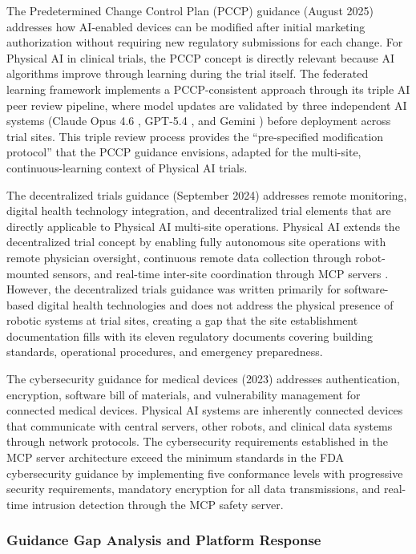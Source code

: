 The Predetermined Change Control Plan (PCCP) guidance (August 2025)
addresses how AI-enabled devices can be modified after initial marketing
authorization without requiring new regulatory submissions for each change.
For Physical AI in clinical trials, the PCCP concept is directly relevant
because AI algorithms improve through learning during the trial itself. The
federated learning framework \cite{fl-paper} implements a PCCP-consistent
approach through its triple AI peer review pipeline, where model updates are
validated by three independent AI systems (Claude Opus 4.6 \cite{claude-opus},
GPT-5.4 \cite{gpt-5-4}, and Gemini \cite{gemini}) before deployment across
trial sites. This triple review process provides the ``pre-specified
modification protocol'' that the PCCP guidance envisions, adapted for the
multi-site, continuous-learning context of Physical AI trials.

The decentralized trials guidance (September 2024) addresses remote
monitoring, digital health technology integration, and decentralized trial
elements that are directly applicable to Physical AI multi-site operations.
Physical AI extends the decentralized trial concept by enabling fully
autonomous site operations with remote physician oversight, continuous remote
data collection through robot-mounted sensors, and real-time inter-site
coordination through MCP servers \cite{national-mcp-paper}. However, the
decentralized trials guidance was written primarily for software-based
digital health technologies and does not address the physical presence of
robotic systems at trial sites, creating a gap that the site establishment
documentation \cite{site-docs} fills with its eleven regulatory documents
covering building standards, operational procedures, and emergency
preparedness.

The cybersecurity guidance for medical devices (2023) addresses
authentication, encryption, software bill of materials, and vulnerability
management for connected medical devices. Physical AI systems are inherently
connected devices that communicate with central servers, other robots, and
clinical data systems through network protocols. The cybersecurity
requirements established in the MCP server architecture
\cite{national-mcp-paper} exceed the minimum standards in the FDA
cybersecurity guidance by implementing five conformance levels with
progressive security requirements, mandatory encryption for all data
transmissions, and real-time intrusion detection through the MCP safety
server.

\subsubsection{Guidance Gap Analysis and Platform Response}

